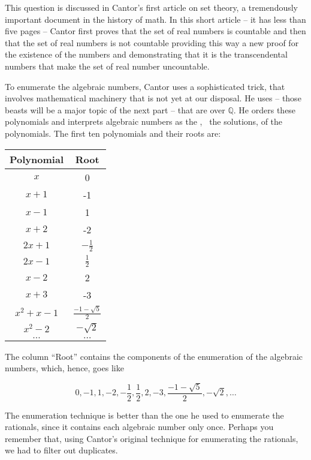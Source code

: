 \documentclass[tikz]{scrreprt}
\begin{document}
This question is discussed in Cantor's first article
on set theory, a tremendously important document
in the history of math.
In this short article -- it has less than five pages --
Cantor first proves that the set of real
 numbers is countable and then
that the set of real numbers is not countable
providing this way a new proof for the existence
of the  numbers
and demonstrating that it is the transcendental numbers
that make the set of real number uncountable.

To enumerate the algebraic numbers,
Cantor uses a sophisticated trick, that
involves mathematical machinery that is not yet
at our disposal. He uses  --
those beasts will be a major topic of the next part --
that are  over $\mathbb{Q}$.
He orders these polynomials and interprets
algebraic numbers as the ,
\ie\ the solutions, of the polynomials.
The first ten polynomials and their roots are:

\begin{center}
\begingroup
\renewcommand{\arraystretch}{1.5}
\begin{tabular}{|c|c|}
\hline
Polynomial & Root \\\hline\hline
$x$       & 0  \\\hline
$x+1$     & -1 \\\hline
$x-1$     & 1   \\\hline
$x+2$     & -2  \\\hline
$2x+1$    & $-\frac{1}{2}$ \\\hline
$2x-1$    & $\frac{1}{2}$  \\\hline
$x-2$     &  2             \\\hline
$x+3$     & -3             \\\hline
$x^2+x-1$ & $\frac{-1-\sqrt{5}}{2}$ \\\hline
$x^2-2$   & $-\sqrt{2}$ \\\hline
$\dots$   & $\dots$\\\hline
\end{tabular}
\endgroup
\end{center}

The column ``Root'' contains the components of the enumeration
of the algebraic numbers, which, hence, goes like

\[
0,-1,1,-2,-\frac{1}{2},\frac{1}{2},2,-3,\frac{-1-\sqrt{5}}{2},-\sqrt{2},\dots
\]

The enumeration technique is better than the one
he used to enumerate the rationals, since it contains
each algebraic number only once. Perhaps you remember
that, using Cantor's original technique 
for enumerating the rationals, we had to
filter out duplicates.
\end{document}
